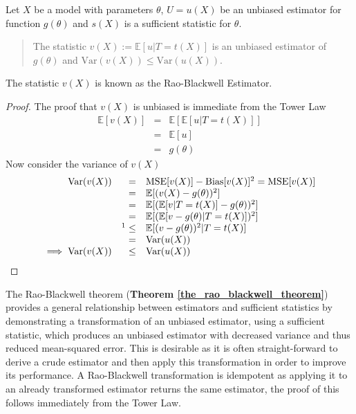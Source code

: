\documentclass[bibliography=totoc,11pt,a4paper,margin=0]{article}
\newcommand*{\expect}{\mathbb{E}}
\theoremstyle{break}
\begin{document}
  \begin{box_theorem}\label{the_rao_blackwell_theorem}
    Let $X$ be a model with parameters $\theta$, $U=u(X)$ be an unbiased estimator for function $g(\theta)$ and $s(X)$ is a sufficient statistic for $\theta$.
    \begin{quote}
      The statistic $v(X):=\expect[u|T=t(X)]$ is an unbiased estimator of $g(\theta)$ and $\text{Var}(v(X))\leq\text{Var}(u(X))$.
    \end{quote}
    The statistic $v(X)$ is known as the Rao-Blackwell Estimator.
    \begin{proof}
      The proof that $v(X)$ is unbiased is immediate from the Tower Law
      \[\begin{array}{rcl}
        \expect[v(X)]&=&\expect[\expect[u|T=t(X)]]\\
        &=&\expect[u]\\
        &=&g(\theta)
      \end{array}\]
      Now consider the variance of $v(X)$
      \[\begin{array}{rrl}
        \text{Var}(v(X))&=&\text{MSE}[v(X)]-\text{Bias}[v(X)]^2=\text{MSE}[v(X)]\\
        &=&\expect[(v(X)-g(\theta))^2]\\
        &=&\expect[(\expect[v|T=t(X)]-g(\theta))^2]\\
        &=&\expect[(\expect[v-g(\theta)|T=t(X)])^2]\\
        &\footnotemark\leq&\expect[(v-g(\theta))^2|T=t(X)]\\
        &=&\text{Var}(u(X))\\
        \implies\text{Var}(v(X))&\leq&\text{Var}(u(X))
      \end{array}\]
      \footnotetext{$\text{Var}(X)=\expect[X^2]-\expect[X]^2\implies\expect[X^2]\geq\expect[X]^2$}
    \end{proof}
  \end{box_theorem}

  \par The Rao-Blackwell theorem (\textbf{Theorem \ref{the_rao_blackwell_theorem}}) provides a general relationship between estimators and sufficient statistics by demonstrating a transformation of an unbiased estimator, using a sufficient statistic, which produces an unbiased estimator with decreased variance and thus reduced mean-squared error.
  This is desirable as it is often straight-forward to derive a crude estimator and then apply this transformation in order to improve its performance. %
  A Rao-Blackwell transformation is idempotent as applying it to an already transformed estimator returns the same estimator, the proof of this follows immediately from the Tower Law.
\end{document}

